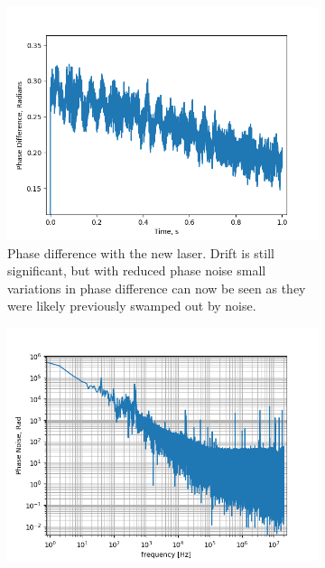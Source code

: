 \documentclass[12pt,a4paper,oneside]{report}
\begin{document}
\begin{figure}[H]
  \begin{subfigure}{.5\textwidth}
    \centering\captionsetup{width=.9\linewidth}
    \includegraphics[width=\textwidth,angle=0]{DImages/Phase_Difference_shot_26_Date_20180416.png}
    \caption{Phase difference with the new laser. Drift is still significant, but with reduced phase noise small variations in phase difference can now be seen as they were likely previously swamped out by noise.\\}
  \end{subfigure}
  \begin{subfigure}{.5\textwidth}
    \centering\captionsetup{width=.9\linewidth}
    \includegraphics[width=\textwidth, angle=0]{DImages/FFT_for_shot_26_Date_20180416.png}

\end{subfigure}
\end{figure}
\end{document}
